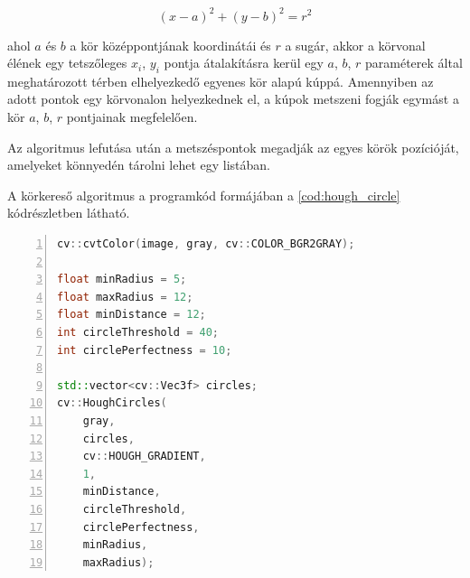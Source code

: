 \begin{equation}
    (x - a)^2 + (y - b)^2 = r^2
    \label{for:hough_transform}
\end{equation}

\par ahol $a$ és $b$ a kör középpontjának koordinátái és $r$ a sugár, akkor a körvonal élének egy tetszőleges $x_i$, $y_i$ pontja átalakításra kerül egy $a$, $b$, $r$ paraméterek által meghatározott térben elhelyezkedő egyenes kör alapú kúppá.\cite{hough_transform,YUEN199071} Amennyiben az adott pontok egy körvonalon helyezkednek el, a kúpok metszeni fogják egymást a kör $a$, $b$, $r$ pontjainak megfelelően.\cite{YUEN199071}
\par Az algoritmus lefutása után a metszéspontok megadják az egyes körök pozícióját, amelyeket könnyedén tárolni lehet egy listában.
\par A körkereső algoritmus a programkód formájában a \ref{cod:hough_circle} kódrészletben látható.

\vspace{5mm}
\hspace{-10mm}
\begin{minipage}{\linewidth}
\begin{lstlisting}[language=C++, numbers=left, caption={A körkereső algoritmus.}, label={cod:hough_circle}]
cv::cvtColor(image, gray, cv::COLOR_BGR2GRAY);

float minRadius = 5;
float maxRadius = 12;
float minDistance = 12;
int circleThreshold = 40;
int circlePerfectness = 10;

std::vector<cv::Vec3f> circles;
cv::HoughCircles(
    gray,
    circles,
    cv::HOUGH_GRADIENT,
    1,
    minDistance,
    circleThreshold,
    circlePerfectness,
    minRadius,
    maxRadius);
\end{lstlisting}
\end{minipage}

